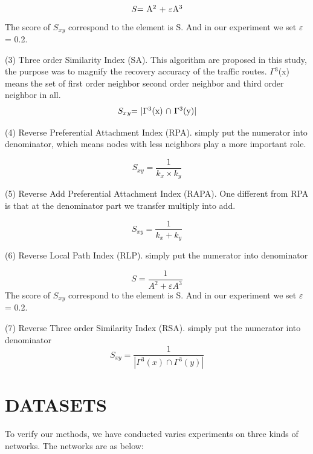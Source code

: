 \documentclass[onecolumn,preprintnumbers,amsmath,amssymb]{revtex4}
\begin{document}
\begin{equation}
\centerline{
$S$=
A$^2$ + $\varepsilon$A$^3$
}
\end{equation}
The score of $S_x$$_y$ correspond to the element is S. And in our experiment we set 
$\varepsilon$= 0.2.


(3) Three order Similarity Index (SA). This algorithm are proposed in this study, the purpose was to magnify the recovery accuracy of the traffic routes. $\Gamma$$^3$(x) means the set of first order neighbor second order neighbor and third order neighbor in all.
\begin{equation}
\centerline{
$S_x$$_y$=
$|$$\Gamma$$^3$(x) $\cap$ $\Gamma$$^3$(y)$|$
}
\end{equation}


(4) Reverse Preferential Attachment Index (RPA). simply put the numerator into denominator, which means nodes with less neighbors play a more important role.


\begin{equation}
S_{xy}=\frac{1}{k_x \times k_y}
\end{equation}

(5) Reverse Add Preferential Attachment Index (RAPA). One different from RPA is that at the denominator part we transfer multiply into add.


\begin{equation}
S_{xy}=\frac{1}{k_x + k_y}
\end{equation}

(6) Reverse Local Path Index (RLP). simply put the numerator into denominator

\begin{equation}
S=\frac{1}{A^2 + \varepsilon A^3}
\end{equation}
The score of $S_x$$_y$ correspond to the element is S. And in our experiment we set 
$\varepsilon$= 0.2.


(7) Reverse Three order Similarity Index (RSA). simply put the numerator into denominator
\begin{equation}
S_{xy}=\frac{1}{ |\Gamma^3(x) \cap \Gamma^3(y)|}
\end{equation}




\section*{DATASETS\protect}
To verify our methods, we have conducted varies experiments on three kinds of networks. The networks are as below:
\end{document}
